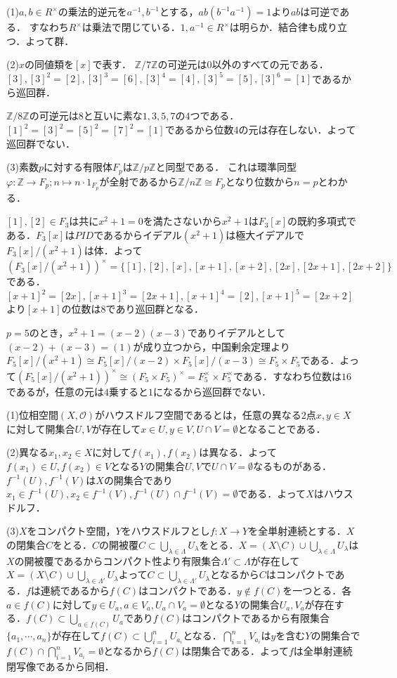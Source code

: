 \documentclass[
		book,
		head_space=20mm,
		foot_space=20mm,
		gutter=10mm,
		line_length=190mm
]{jlreq}
\begin{document}
    (1)$a,b \in R^{\times}$の乗法的逆元を$a^{-1},b^{-1}$とする，$ab(b^{-1}a^{-1})=1$より$ab$は可逆である．
    すなわち$R^{\times}$は乗法で閉じている．$1,a^{-1}\in R^{\times}$は明らか．結合律も成り立つ．よって群．

    (2)$x$の同値類を$[x]$で表す．
    $\mathbb{Z}/7 \mathbb{Z}$の可逆元は$0$以外のすべての元である．$[3],[3]^2=[2],[3]^3=[6],[3]^4=[4],[3]^5=[5],[3]^6=[1]$であるから巡回群．

    $\mathbb{Z}/ 8 \mathbb{Z}$の可逆元は$8$と互いに素な$1,3,5,7$の$4$つである．$[1]^2=[3]^2=[5]^2=[7]^2=[1]$であるから位数$4$の元は存在しない．よって巡回群でない．

    (3)素数$p$に対する有限体$F_p$は$\mathbb{Z}/ p \mathbb{Z}$と同型である．
    これは環準同型$\varphi\colon \mathbb{Z} \rightarrow F_p;n\mapsto n \cdot 1_{F_p}$が全射であるから$\mathbb{Z}/n \mathbb{Z} \cong F_p$となり位数から$n=p$とわかる．

    $[1],[2]\in F_3$は共に$x^2+1=0$を満たさないから$x^2+1$は$F_3[x]$の既約多項式である．$F_3[x]$は$PID$であるからイデアル$(x^2+1)$は極大イデアルで$F_3[x]/(x^2+1)$は体．よって$(F_3[x]/(x^2+1))^{\times}=\{[1],[2],[x],[x+1],[x+2],[2x],[2x+1],[2x+2]\}$である．$[x+1]^2=[2x],[x+1]^3=[2x+1],[x+1]^4=[2],[x+1]^5=[2x+2]$より$[x+1]$の位数は$8$であり巡回群となる．

    $p=5$のとき，$x^2+1=(x-2)(x-3)$でありイデアルとして$(x-2)+(x-3)=(1)$が成り立つから，中国剰余定理より$F_5[x]/(x^2+1)\cong F_5[x]/(x-2)\times F_5[x]/(x-3)\cong F_5\times F_5$である．よって$(F_5[x]/(x^2+1))^{\times}\cong (F_5\times F_5)^{\times}=F_5^{\times}\times F_5^{\times}$である．すなわち位数は$16$であるが，任意の元は$4$乗すると$1$になるから巡回群でない．

    (1)位相空間$(X,\mathcal{O})$がハウスドルフ空間であるとは，任意の異なる$2$点$x,y\in X$に対して開集合$U,V$が存在して$x\in U,y\in V,U\cap V=\emptyset$となることである．

    (2)異なる$x_1,x_2 \in X$に対して$f(x_1),f(x_2)$は異なる．よって$f(x_1)\in U, f(x_2)\in V$となる$Y$の開集合$U,V$で$U\cap V=\emptyset$なるものがある．$f^{-1}(U),f^{-1}(V)$は$X$の開集合であり$x_1\in f^{-1}(U),x_2\in f^{-1}(V), f^{-1}(U)\cap f^{-1}(V)=\emptyset$である．よって$X$はハウスドルフ．

    (3)$X$をコンパクト空間，$Y$をハウスドルフとし$f\colon X \rightarrow Y$を全単射連続とする．$X$の閉集合$C$をとる．$C$の開被覆$C \subset \bigcup_{\lambda \in \Lambda}U_{\lambda}$をとる．$X= (X\setminus C) \cup \bigcup_{\lambda \in \Lambda} U_{\lambda} $は$X$の開被覆であるからコンパクト性より有限集合$\Lambda' \subset \Lambda$が存在して$X=(X\setminus C) \cup \bigcup_{\lambda \in \Lambda'} U_{\lambda}$よって$C\subset \bigcup_{\lambda \in \Lambda'} U_{\lambda}$となるから$C$はコンパクトである．$f$は連続であるから$f(C)$はコンパクトである．$y \notin f(C)$を一つとる．各$a \in f(C)$に対して$y \in U_a, a \in V_a ,U_a \cap V_a=\emptyset$となる$Y$の開集合$U_a,V_a$が存在する．$f(C) \subset \bigcup_{a \in f(C)} U_a$であり$f(C)$はコンパクトであるから有限集合$\{a_1,\cdots,a_n\}$が存在して$f(C) \subset \bigcup_{i=1}^n U_{a_i}$となる．$\bigcap_{i=1}^n V_{a_i}$は$y$を含む$Y$の開集合で$f(C) \cap \bigcap_{i=1}^n V_{a_i}=\emptyset$となるから$f(C)$は閉集合である．よって$f$は全単射連続閉写像であるから同相．
\end{document}
